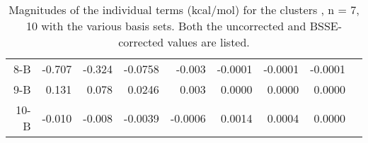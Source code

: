 \begin{table}[t]
\begin{adjustbox}{width=\columnwidth,center}
\begin{tabular}{@{}rrrrrrrrr@{}}
8-B  & -0.707  & -0.324  & -0.0758 & -0.003    & -0.0001 & -0.0001 & -0.0001 &           \\
9-B  & 0.131   & 0.078   & 0.0246  & 0.003     & 0.0000  & 0.0000  & 0.0000  &           \\
10-B & -0.010  & -0.008  & -0.0039 & -0.0006   & 0.0014  & 0.0004  & 0.0000  &           \\ \bottomrule
\end{tabular}
\end{adjustbox}
\begin{spacing}{1.0}
\caption[Magnitudes of the individual terms (kcal/mol) for the clusters , n = 7, 10 with the various basis sets. Both the uncorrected and BSSE-corrected values are listed.]{Magnitudes of the individual terms (kcal/mol) for the clusters , n = 7, 10 with the various basis sets. Both the uncorrected and BSSE-corrected values are listed.}\label{tab:MBE_I_T1}
\end{spacing}
\end{table}